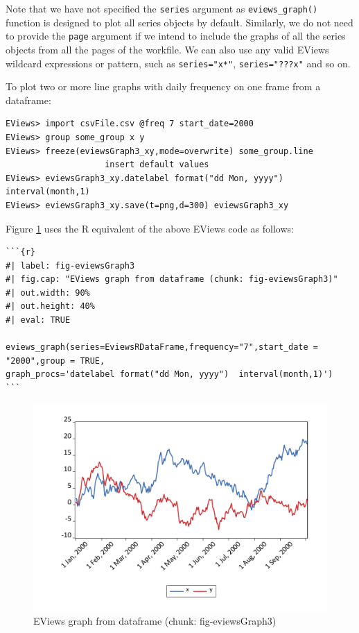 Note that we have not specified the \texttt{series} argument as \texttt{eviews\_graph()} function is designed to plot all series objects by default. Similarly, we do not need to provide the \texttt{page} argument if we intend to include the graphs of all the series objects from all the pages of the workfile. We can also use any valid EViews wildcard expressions or pattern, such as \texttt{series="x*"}, \texttt{series="???x"} and so on.

To plot two or more line graphs with daily frequency on one frame from a dataframe:

\begin{verbatim}
EViews> import csvFile.csv @freq 7 start_date=2000
EViews> group some_group x y
EViews> freeze(eviewsGraph3_xy,mode=overwrite) some_group.line
                    insert default values
EViews> eviewsGraph3_xy.datelabel format("dd Mon, yyyy")  interval(month,1)
EViews> eviewsGraph3_xy.save(t=png,d=300) eviewsGraph3_xy
\end{verbatim}

Figure \ref{fig:fig-eviewsGraph3} uses the R equivalent of the above EViews code as follows:

\begin{verbatim}
```{r} 
#| label: fig-eviewsGraph3
#| fig.cap: "EViews graph from dataframe (chunk: fig-eviewsGraph3)"
#| out.width: 90%
#| out.height: 40%
#| eval: TRUE

eviews_graph(series=EviewsRDataFrame,frequency="7",start_date = "2000",group = TRUE,
graph_procs='datelabel format("dd Mon, yyyy")  interval(month,1)')
```
\end{verbatim}

\begin{figure}

{\centering \includegraphics[width=0.9\linewidth,height=0.4\textheight]{figures/eviewsgraph3-eviewsgraph3-xy} 

}

\caption{EViews graph from dataframe (chunk: fig-eviewsGraph3)}\label{fig:fig-eviewsGraph3}
\end{figure}

